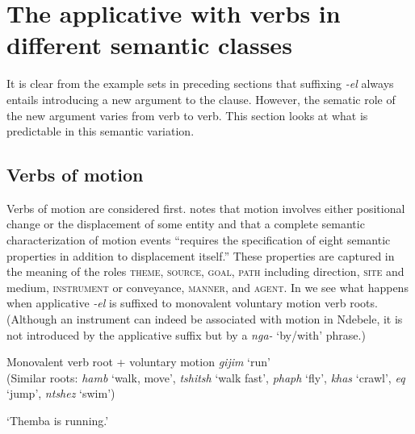 \documentclass[output=paper]{langsci/langscibook}
\begin{document}
\section{The applicative with verbs in different semantic classes}\label{sec:sibanda:4}

It is clear from the example sets in preceding sections that suffixing \textit{-el} always entails introducing a new argument to the clause. However, the sematic role of the new argument varies from verb to verb. This section looks at what is predictable in this semantic variation.

\subsection{Verbs of motion} \label{sec:sibanda:4.1}

Verbs of motion are considered first. \citet[171]{Frawley1992} notes that motion involves either positional change or the displacement of some entity and that a complete semantic characterization of motion events “requires the specification of eight semantic properties in addition to displacement itself.” These properties are captured in the meaning of the roles \textsc{theme}, \textsc{source}, \textsc{goal}, \textsc{path} including direction, \textsc{site} and medium, \textsc{instrument} or conveyance, \textsc{manner}, and \textsc{agent}. In  we see what happens when applicative \textit{-el} is suffixed to monovalent voluntary motion verb roots. (Although an instrument can indeed be associated with motion in Ndebele, it is not introduced by the applicative suffix but by a \textit{nga-} ‘by/with’ phrase.)

\ea\label{ex:sibanda:5}
\settowidth{}
{Monovalent verb root + voluntary motion \textit{gijim} ‘run’}\\
 (Similar roots: \textit{hamb} ‘walk, move’, \textit{tshitsh} ‘walk fast’, \textit{phaph} ‘fly’, \textit{khas} ‘crawl’, \textit{eq} ‘jump’, \textit{ntshez} ‘swim’)\\
 

\glt ‘Themba is running.’

\end{document}
